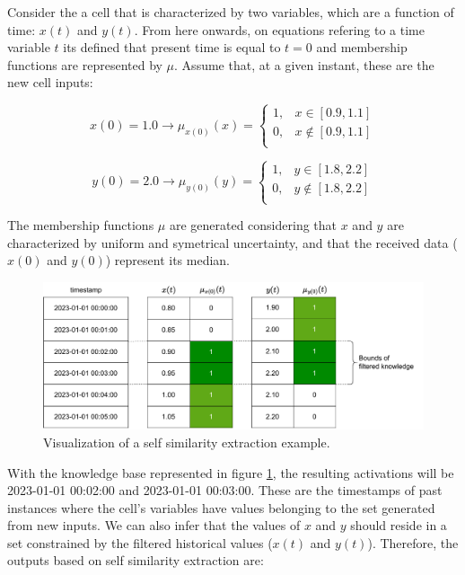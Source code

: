 \bigskip

Consider the a cell that is characterized by two variables, which are a function of time: $x(t)$ and $y(t)$. 
From here onwards, on equations refering to a time variable $t$ its defined that present time is equal to $t=0$ and membership functions are represented by $\mu$.
Assume that, at a given instant, these are the new cell inputs:

\begin{equation}
x(0) = 1.0 \rightarrow \mu_{x(0)}(x) =
\begin{cases}
1, & x \in [0.9, 1.1] \\
0, & x \notin [0.9, 1.1] \\
\end{cases}
\end{equation}

\begin{equation}
y(0) = 2.0 \rightarrow \mu_{y(0)}(y) =
\begin{cases}
1, & y \in [1.8, 2.2] \\
0, & y \notin [1.8, 2.2] \\
\end{cases}
\end{equation}

The membership functions $\mu$ are generated considering that $x$ and $y$ are characterized by uniform and symetrical uncertainty, and that the received data ($x(0)$ and $y(0)$) represent its median.

\begin{figure}[h!]
    \centering
    \includegraphics[width=\linewidth]{figures/chapter4/cell/solo_state_estimation.pdf}
    \caption{Visualization of a self similarity extraction example.}
    \label{fig:solo_state_estimation}
\end{figure}


With the knowledge base represented in figure \ref{fig:solo_state_estimation}, the resulting activations will be 2023-01-01 00:02:00 and 2023-01-01 00:03:00. These are the timestamps of past instances where the cell's variables have values belonging to the set generated from new inputs. We can also infer that the values of $x$ and $y$ should reside in a set constrained by the filtered historical values ($x(t)$ and $y(t)$). Therefore, the outputs based on self similarity extraction are:

